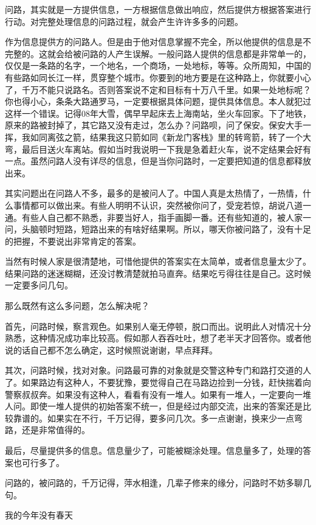 问路，其实就是一方提供信息，一方根据信息做出响应，然后提供方根据答案进行行动。对完整处理信息的问路过程，就会产生许许多多的问题。

作为信息提供方的问路人。但是由于他对信息掌握不完全，所以他提供的信息是不完整的。这就会给被问路的人产生误解。一般问路人提供的信息都是非常单一的，仅仅是一条路的名字，一个地名，一个商场，一处地标，等等。众所周知，中国的有些路如同长江一样，贯穿整个城市。你要到的地方要是在这种路上，你就要小心了，千万不能只说路名。否则答案说不定和目标有十万八千里。如果一处地标呢？你也得小心，条条大路通罗马，一定要根据具体问题，提供具体信息。本人就犯过这样一个错误。记得08年大雪，偶早早起床去上海南站，坐火车回家。下了地铁，原来的路被封掉了，其它路又没有走过，怎么办？问路呗，问了保安。保安大手一挥，我如同离弦之箭，结果我这只箭如同《新龙门客栈》里的转弯箭，转了一个大弯，最后目送火车离站。假如当时我说明一下我是急着赶火车，说不定结果会好有一点。虽然问路人没有详尽的信息，但是当你问路时，一定要把知道的信息都释放出来。

其实问题出在问路人不多，最多的是被问人了。中国人真是太热情了，一热情，什么事情都可以做出来。有些人明明不认识，突然被你问了，受宠若惊，胡说八道一通。有些人自己都不熟悉，非要当好人，指手画脚一番。还有些知道的，被人家一问，头脑顿时短路，短路出来的有啥好结果啊。所以，哪天你被问路了，没有十足的把握，不要说出非常肯定的答案。

当然有时候人家是很清楚地，可惜他提供的答案实在太简单，或者信息量太少了。结果问路的迷迷糊糊，还没讨教清楚就拍马直奔。结果吃亏得往往是自己。这时候一定要多问几句。

那么既然有这么多问题，怎么解决呢？

首先，问路时候，察言观色。如果别人毫无停顿，脱口而出。说明此人对情况十分熟悉，这种情况成功率比较高。假如那人吞吞吐吐，想了老半天才回答你。或者他说的话自己都不怎么确定，这时候照说谢谢，早点拜拜。

其次，问路时候，找对对象。问路最可靠的对象就是交警这种专门和路打交道的人了。如果路边有这种人，不要犹豫，要觉得自己在马路边捡到一分钱，赶快揣着向警察叔叔奔。如果没有这种人，看看有没有一堆人。如果有一堆人，一定要向一堆人问。即使一堆人提供的初始答案不统一，但是经过内部交流，出来的答案还是比较靠谱的。如果实在不行，千万记得，要多问几次。多一点谢谢，换来少一点弯路，还是非常值得的。

最后，尽量提供多的信息。信息量少了，可能被糊涂处理。信息量多了，处理的答案也可行多了。

问路的，被问路的，千万记得，萍水相逢，几辈子修来的缘分，问路时不妨多聊几句。

我的今年没有春天


